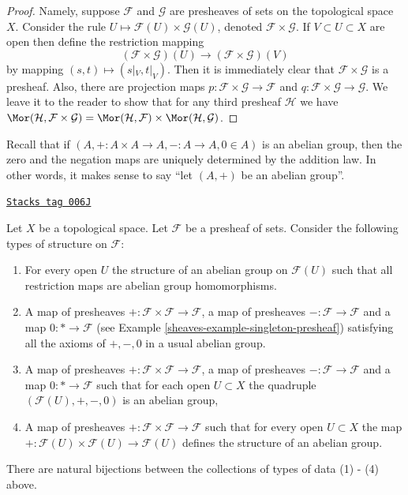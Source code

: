 \begin{proof}
Namely, suppose $\mathcal{F}$ and $\mathcal{G}$ are
presheaves of sets on the topological space $X$.
Consider the rule $U \mapsto \mathcal{F}(U) \times \mathcal{G}(U)$,
denoted $\mathcal{F} \times \mathcal{G}$. If $V \subset U \subset X$
are open then define the restriction mapping
$$
(\mathcal{F} \times \mathcal{G})(U)
\longrightarrow
(\mathcal{F} \times \mathcal{G})(V)
$$
by mapping $(s, t) \mapsto (s|_V, t|_V)$. Then it is immediately
clear that $\mathcal{F} \times \mathcal{G}$ is a presheaf.
Also, there are projection maps
$p : \mathcal{F} \times \mathcal{G} \to \mathcal{F}$
and
$q : \mathcal{F} \times \mathcal{G} \to \mathcal{G}$.
We leave it to the reader to show that
for any third presheaf $\mathcal{H}$ we have
$\Mor(\mathcal{H}, \mathcal{F} \times \mathcal{G})
= \Mor(\mathcal{H}, \mathcal{F}) \times
\Mor(\mathcal{H}, \mathcal{G})$.
\end{proof}

Recall that if $(A, + : A \times A \to A, - : A \to A, 0\in A)$
is an abelian group, then the zero and the negation maps are
uniquely determined by the addition law. In other words, it
makes sense to say ``let $(A, +)$ be an abelian group''.

\begin{lemma}
\label{sheaves-lemma-abelian-presheaves}
\href{https://stacks.math.columbia.edu/tag/006J}{\texttt{Stacks tag 006J}}

Let $X$ be a topological space.
Let $\mathcal{F}$ be a presheaf of sets.
Consider the following types of structure on $\mathcal{F}$:
\begin{enumerate}
\item For every open $U$ the structure of an abelian group
on $\mathcal{F}(U)$ such that all restriction maps are
abelian group homomorphisms.
\item A map of presheaves
$+ : \mathcal{F} \times \mathcal{F} \to \mathcal{F}$,
a map of presheaves $- : \mathcal{F} \to \mathcal{F}$
and a map $0 : * \to \mathcal{F}$
(see Example \ref{sheaves-example-singleton-presheaf})
satisfying all the axioms of $+, -, 0$ in a usual
abelian group.
\item A map of presheaves
$+ : \mathcal{F} \times \mathcal{F} \to \mathcal{F}$,
a map of presheaves $- : \mathcal{F} \to \mathcal{F}$
and a map $0 : * \to \mathcal{F}$
such that for each open $U \subset X$ the quadruple
$(\mathcal{F}(U), +, -, 0)$ is an abelian group,
\item A map of presheaves $+ : \mathcal{F} \times \mathcal{F}
\to \mathcal{F}$ such that for every open $U \subset X$
the map $+ : \mathcal{F}(U) \times \mathcal{F}(U) \to \mathcal{F}(U)$
defines the structure of an abelian group.
\end{enumerate}
There are natural bijections between the collections of
types of data (1) - (4) above.
\end{lemma}

